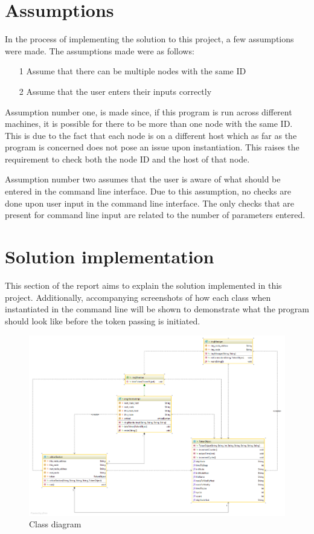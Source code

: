 \documentclass[11pt, a4paper]{article}
\begin{document}
\newpage

\section{Assumptions}

In the process of implementing the solution to this project, a few assumptions were made. The assumptions made were as follows:

\begin{itemize}
\item[1] Assume that there can be multiple nodes with the same ID
\item[2] Assume that the user enters their inputs correctly
\end{itemize}
Assumption number one, is made since, if this program is run across different machines, it is possible for there to be more than one node with the same ID. This is due to the fact that each node is on a different host which as far as the program is concerned does not pose an issue upon instantiation. This raises the requirement to check both the node ID and the host of that node.

Assumption number two assumes that the user is aware of what should be entered in the command line interface. Due to this assumption, no checks are done upon user input in the command line interface. The only checks that are present for command line input are related to the number of parameters entered. 

\newpage

\section{Solution implementation}

This section of the report aims to explain the solution implemented in this project. Additionally, accompanying screenshots of how each class when instantiated in the command line will be shown to demonstrate what the program should look like before the token passing is initiated.

\begin{figure}[!h]
\centering
\includegraphics[scale=0.26]{class_diagram}
\caption{Class diagram}
\end{figure}
\end{document}
